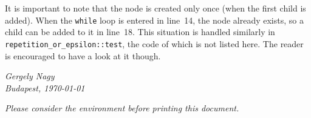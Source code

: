 \documentclass[12pt]{article}
\begin{document}
It is important to note that the node is created only once (when the first child is added). When the
\texttt{while} loop is entered in line~14, the node already exists, so a child can be added to it in line~18.
This situation is handled similarly in \texttt{repetition\_or\_epsilon::test}, the code of which is not listed
here. The reader is encouraged to have a look at it though.

\vfill
\vfill
\vfill
\hfill\begin{minipage}[h]{0.3\textwidth}
\begin{center}
	\textit{Gergely Nagy}\\
	\textit{Budapest, \today}
\end{center}
\end{minipage}
\vfill

\newpage \tableofcontents

\vfill
\vfill
\begin{center}
\footnotesize\emph{Please consider the environment before printing this document.}
\end{center}
\vfill
\end{document}
